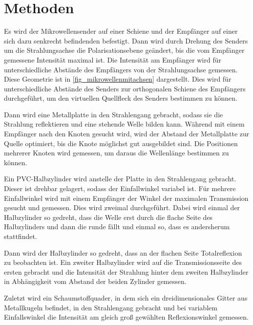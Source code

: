 \documentclass[
	a4paper,
	12pt,
	pagesize,
	ngerman
]{scrartcl}
\begin{document}
	\section{Methoden}
	Es wird der Mikrowellensender auf einer Schiene und der Empfänger auf  einer sich dazu senkrecht befindenden befestigt.
	Dann wird durch Drehung des Senders um die Strahlungsachse die Polarisationsebene geändert, bis die vom Empfänger gemessene Intensität maximal ist.
	Die Intensität am Empfänger wird für unterschiedliche Abstände des Empfängers von der Strahlungsachse gemessen.
	Diese Geometrie ist in \cref{fig_mikrowellenmitachsen} dargestellt.
	Dies wird für unterschiedliche Abstände des Senders zur orthogonalen Schiene des Empfängers durchgeführt, um den virtuellen Quellfleck des Senders bestimmen zu können.
	
	Dann wird eine Metallplatte in den Strahlengang gebracht, sodass sie die Strahlung reflektieren und eine stehende Welle bilden kann.
	Während mit einem Empfänger nach den Knoten gesucht wird, wird der Abstand der Metallplatte zur Quelle optimiert, bis die Knote möglichst gut ausgebildet sind. %
	Die Positionen mehrerer Knoten wird gemessen, um daraus die Wellenlänge bestimmen zu können. %
	
	Ein PVC-Halbzylinder wird anstelle der Platte in den Strahlengang gebracht.
	Dieser ist drehbar gelagert, sodass der Einfallwinkel variabel ist.
	Für mehrere Einfallwinkel wird mit einem Empfänger der Winkel der maximalen Transmission gesucht und gemessen.
	Dies wird zweimal durchgeführt.
	Dabei wird einmal der Halbzylinder so gedreht, dass die Welle erst durch die flache Seite des Halbzylinders und dann die runde fällt und einmal so, dass es andersherum stattfindet.
	
	Dann wird der Halbzylinder so gedreht, dass an der flachen Seite Totalreflexion zu beobachten ist. %
	Ein zweiter Halbzylinder wird auf die Transmissionsseite des ersten gebracht und die Intensität der Strahlung hinter dem zweiten Halbzylinder in Abhängigkeit vom Abstand der beiden Zylinder gemessen.
	
	Zuletzt wird ein Schaumstoffquader, in dem sich ein dreidimensionales Gitter aus Metallkugeln befindet, in den Strahlengang gebracht und bei variablem Einfallswinkel die Intensität am gleich groß gewählten Reflexionswinkel gemessen.
	
\end{document}
